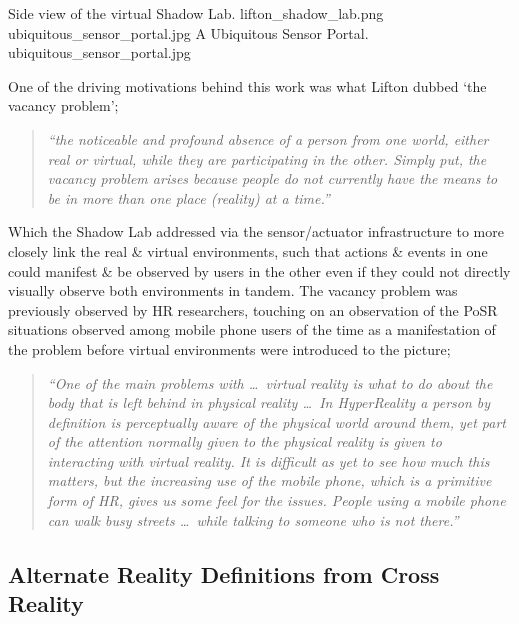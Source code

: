  {Side view of the virtual Shadow Lab.} {lifton_shadow_lab.png}
       {ubiquitous_sensor_portal.jpg} {A Ubiquitous Sensor Portal.} {ubiquitous_sensor_portal.jpg}

One of the driving motivations behind this work was what Lifton dubbed `the vacancy problem';

\begin{quote}
\textit{``the noticeable and profound absence of a person from one world, either real or virtual, while they are participating in the other. Simply put, the vacancy problem arises because people do not currently have the means to be in more than one place (reality) at a time.''}~\cite{Lifton2007a}
\end{quote}

Which the Shadow Lab addressed via the sensor/actuator infrastructure to more closely link the real \& virtual environments, such that actions \& events in one could manifest \& be observed by users in the other even if they could not directly visually observe both environments in tandem. The vacancy problem was previously observed by HR researchers, touching on an observation of the PoSR situations observed among mobile phone users of the time as a manifestation of the problem before virtual environments were introduced to the picture; %

\begin{quote}
	\textit{``One of the main problems with \ldots\ virtual reality is what to do about the body that is left behind in physical reality \ldots\ In HyperReality a person by definition is perceptually aware of the physical world around them, yet part of the attention normally given to the physical reality is given to interacting with virtual reality. It is difficult as yet to see how much this matters, but the increasing use of the mobile phone, which is a primitive form of HR, gives us some feel for the issues. People using a mobile phone can walk busy streets \ldots\ while talking to someone who is not there.''}~\cite{Terashima2001}
\end{quote}


\subsection{Alternate Reality Definitions from Cross Reality}

